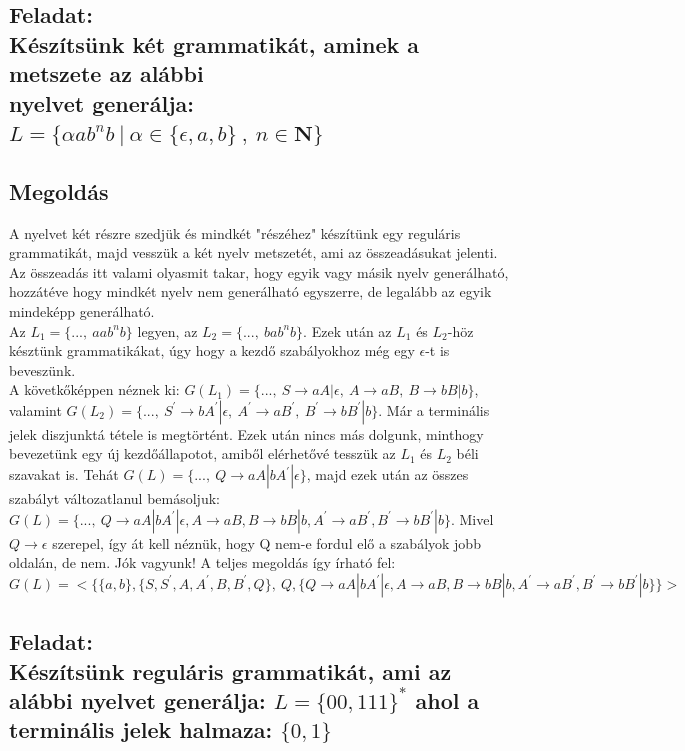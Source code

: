 \documentclass[12pt]{article}
\begin{document}
\subsection{Feladat: \\
Készítsünk két grammatikát, aminek a metszete az alábbi \\ nyelvet generálja:
$ L=\{ \alpha ab^{n}b \ |\ \alpha \in \{ \epsilon, a, b \} \ , \ n \in \mathbf{N} \} $}
\maketitle
\subsection{Megoldás}
A nyelvet két részre szedjük és mindkét "részéhez" készítünk egy reguláris grammatikát, majd vesszük a két
nyelv metszetét, ami az összeadásukat jelenti. Az összeadás itt valami olyasmit takar, hogy egyik vagy
másik nyelv generálható, hozzátéve hogy mindkét nyelv nem generálható egyszerre, de legalább az egyik
mindeképp generálható. \\
Az $L_{1}=\{ ..., \ aab^{n}b \}$ legyen, az $L_{2}=\{ ..., \ bab^{n}b \}$. Ezek után az $L_{1}$ és $L_{2}$-höz
késztünk grammatikákat, úgy hogy a kezdő szabályokhoz még egy $\epsilon$-t is beveszünk. \\
A követkőképpen néznek ki:
$G(L_{1})=\{ ..., \ S \rightarrow aA|\epsilon,\ A \rightarrow aB,\ B \rightarrow bB|b \}$, valamint
$G(L_{2})=\{ ..., \ S^{'} \rightarrow bA^{'}|\epsilon,\ A^{'} \rightarrow aB^{'},\ B^{'} \rightarrow bB^{'}|b \}$.
Már a terminális jelek diszjunktá tétele is megtörtént.
Ezek után nincs más dolgunk, minthogy bevezetünk egy új kezdőállapotot, amiből elérhetővé tesszük az
$L_{1}$ és $L_{2}$ béli szavakat is. Tehát $G(L)=\{..., \ Q \rightarrow aA|bA^{'}|\epsilon \}$, majd ezek után
az összes szabályt változatlanul bemásoljuk:
$G(L)=\{..., \ Q \rightarrow aA|bA^{'}|\epsilon, A \rightarrow aB, B \rightarrow bB|b, A^{'} \rightarrow aB^{'},
B^{'} \rightarrow bB^{'}|b \}$. Mivel $Q \rightarrow \epsilon$ szerepel, így át kell néznük, hogy Q nem-e fordul
elő a szabályok jobb oldalán, de nem. Jók vagyunk! A teljes megoldás így írható fel:
$$ G(L)=<\{ \{ a,b \}, \{ S,S^{'},A,A^{'},B,B^{'},Q \}, \ Q, \{ Q \rightarrow aA|bA^{'}|\epsilon, A \rightarrow 
aB, B \rightarrow bB|b, A^{'} \rightarrow aB^{'}, B^{'} \rightarrow bB^{'}|b \}\}> $$

\subsection{Feladat: \\
Készítsünk reguláris grammatikát, ami az alábbi nyelvet generálja:
$ L=\{ 00, 111 \}^* $ ahol a terminális jelek halmaza: $ \{0, 1\} $}
\maketitle
\end{document}

